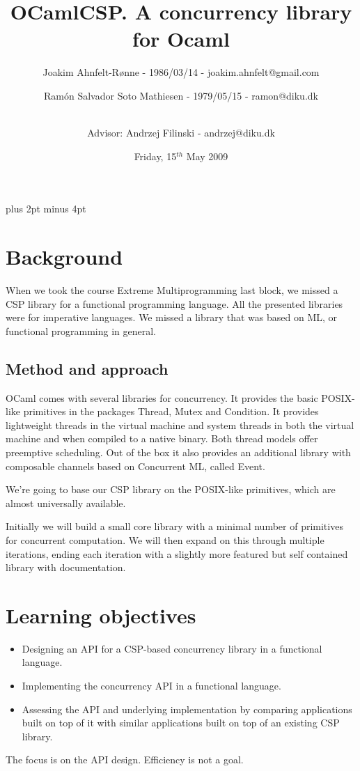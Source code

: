 \documentclass[a4paper,12pt]{article}
\title{OCamlCSP. A concurrency library for Ocaml}
\author{Joakim Ahnfelt-Rønne - 1986/03/14 - joakim.ahnfelt@gmail.com \and 
        Ramón Salvador Soto Mathiesen - 1979/05/15 - ramon@diku.dk \and
        \\ Advisor: Andrzej Filinski - andrzej@diku.dk}
\date{Friday, 15$^{th}$ May 2009}
\begin{document}
\parindent=0pt
\parskip=8pt plus 2pt minus 4pt

\maketitle
\newpage

\section*{Background}
When we took the course Extreme Multiprogramming last block, we missed 
a CSP\cite{hoare} library for a functional programming language. All the 
presented libraries were for imperative languages. We missed a library that 
was based on ML, or functional programming in general.

\subsection*{Method and approach}
OCaml comes with several libraries for concurrency.
It provides the basic POSIX-like primitives in the packages Thread,
Mutex and Condition. It provides lightweight threads in the virtual
machine and system threads in both the virtual machine and when
compiled to a native binary. Both thread models offer preemptive
scheduling. Out of the box it also provides an additional library 
with composable channels based on Concurrent ML, called Event. 

We're going to base our CSP library on the POSIX-like primitives,
which are almost universally available.

Initially we will build a small core library with a minimal number
of primitives for concurrent computation. We will then expand on this
through multiple iterations, ending each iteration with a slightly
more featured but self contained library with documentation.


\section*{Learning objectives} %
\begin{itemize}
 \item Designing an API for a CSP-based concurrency library in a functional
   language.
 \item Implementing the concurrency API in a functional language.
 \item Assessing the API and underlying implementation by comparing
   applications built on top of it with similar applications built on
   top of an existing CSP library.
\end{itemize}
The focus is on the API design. Efficiency is not a goal.
\end{document}
